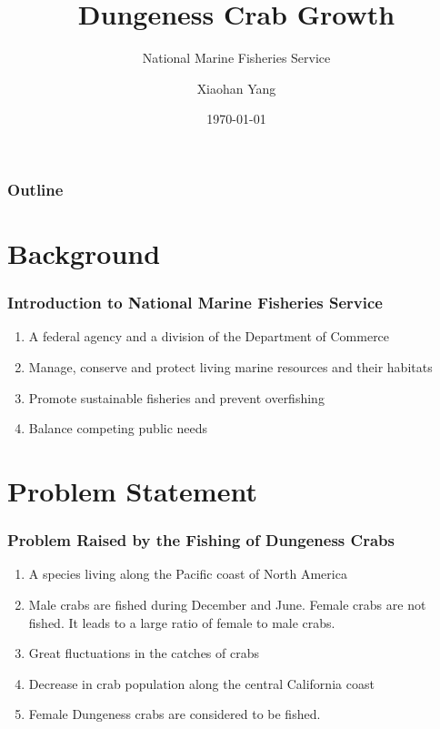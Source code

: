 \documentclass[compress,handout,10pt]{beamer}
\title{{\color{blue} \LARGE Dungeness Crab Growth\newline} }
\subtitle{{\color{red} \large National Marine Fisheries Service} }
\author{ 
    {Xiaohan Yang} \\ 
    \vspace{5pt}
}
\institute{Johns Hopkins University}
\date{\mygreen \today}
\let\olditem\item
\renewcommand{\item}{\setlength{\itemsep}{0.5\baselineskip}\olditem}
\begin{document}
\begin{frame}[plain]
    \titlepage
\end{frame}

\begin{frame}
    \frametitle{Outline}
    \tableofcontents
\end{frame}

\section{Background}

\begin{frame}
    \frametitle{Introduction to National Marine Fisheries Service}
    \vspace{7pt}
             \begin{enumerate}
                 \item A federal agency and a division of the Department of Commerce
                 \item Manage, conserve and protect living marine resources and their habitats
                 \item Promote sustainable fisheries and prevent overfishing
                 \item Balance competing public needs
             \end{enumerate}
\end{frame}

\section{Problem Statement}
\begin{frame}
    \frametitle{Problem Raised by the Fishing of Dungeness Crabs}
     \begin{enumerate}
         \item A species living along the Pacific coast of North America
         \item Male crabs are fished during December and June. Female crabs are not fished. It leads to a large ratio of female to male crabs.
         \item Great fluctuations in the catches of crabs
         \item Decrease in crab population along the central California coast
         \item Female Dungeness crabs are considered to be fished.
     \end{enumerate}
\end{frame}
\end{document}

